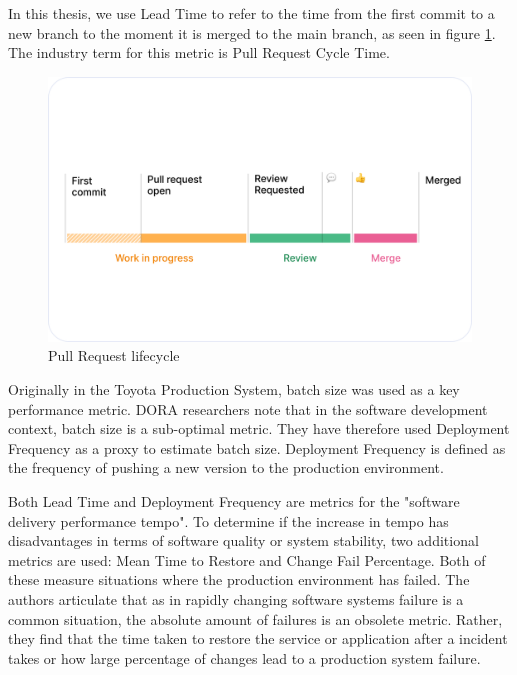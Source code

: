 In this thesis, we use Lead Time to refer to the time from the first commit to a new branch to the moment it is merged to the main branch, as seen in figure \ref{fig:CycleTime}. The industry term for this metric is Pull Request Cycle Time. 

\begin{figure}[ht]
    \begin{center}
        \includegraphics[width=13.5cm]{images/cycletime_defined}
        \caption{Pull Request lifecycle~\cite{swarmia_reducing_nodate}}
        \label{fig:CycleTime}
    \end{center}
\end{figure}

Originally in the Toyota Production System, batch size was used as a key performance metric. DORA researchers note that in the software development context, batch size is a sub-optimal metric. They have therefore used Deployment Frequency as a proxy to estimate batch size. Deployment Frequency is defined as the frequency of pushing a new version to the production environment.  

Both Lead Time and Deployment Frequency are metrics for the "software delivery performance tempo". To determine if the increase in tempo has disadvantages in terms of software quality or system stability, two additional metrics are used: Mean Time to Restore and Change Fail Percentage. Both of these measure situations where the production environment has failed. The authors articulate that as in rapidly changing software systems failure is a common situation, the absolute amount of failures is an obsolete metric. Rather, they find that the time taken to restore the service or application after a incident takes or how large percentage of changes lead to a production system failure. 

